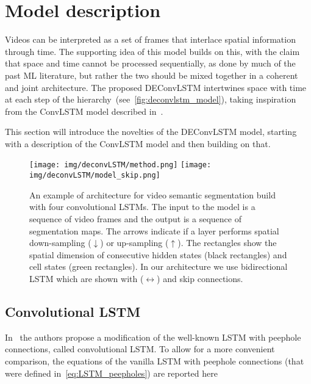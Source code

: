 

\section{Model description}\label{sec:deconvlstm_model}

Videos can be interpreted as a set of frames that interlace spatial information
through time. The supporting idea of this model builds on this, with the claim
that space and time cannot be processed sequentially, as done by much of the
past ML literature, but rather the two should be mixed together in a coherent
and joint architecture. The proposed DEConvLSTM intertwines space with time at
each step of the hierarchy~(see~\autoref{fig:deconvlstm_model}), taking
inspiration from the ConvLSTM model described in~\cite{ShiCWYWW15}.

This section will introduce the novelties of the DEConvLSTM model, starting
with a description of the ConvLSTM model and then building on that.

\begin{figure}[t]
    \centering
    \texttt{[image: img/deconvLSTM/method.png]}
    \texttt{[image: img/deconvLSTM/model\_skip.png]}
    \caption{An example of architecture for video semantic segmentation build
        with four convolutional LSTMs. The input to the model is a sequence of
        video frames and the output is a sequence of segmentation maps. The
        arrows indicate if a layer performs spatial down-sampling
        ($\downarrow$) or up-sampling ($\uparrow$). The rectangles show the
        spatial dimension of consecutive hidden states (black rectangles) and
        cell states (green rectangles). In our architecture we use
        bidirectional LSTM which are shown with ($\leftrightarrow$) and skip
        connections.}\label{fig:deconvlstm_model}
\end{figure}


\subsection{Convolutional LSTM}

In~\cite{ShiCWYWW15} the authors propose a modification of the well-known LSTM
with peephole connections, called convolutional LSTM. To allow for a more
convenient comparison, the equations of the vanilla LSTM with peephole
connections (that were defined in~\autoref{eq:LSTM_peepholes}) are reported
here

